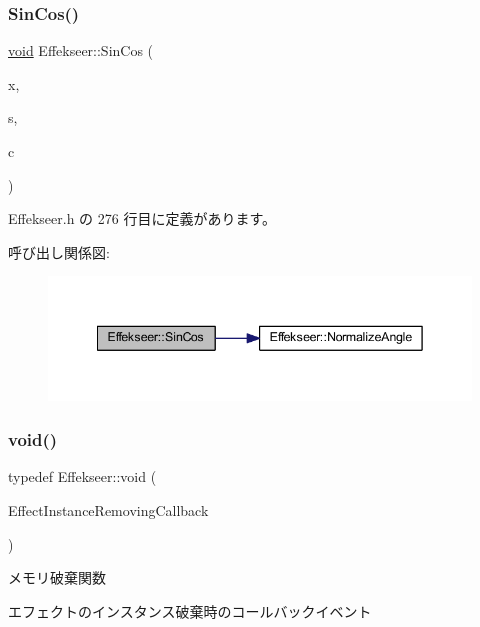 \subsubsection{\texorpdfstring{Sin\+Cos()}{SinCos()}}
{\footnotesize\ttfamily \mbox{\hyperlink{namespace_effekseer_ab34c4088e512200cf4c2716f168deb56}{void}} Effekseer\+::\+Sin\+Cos (\begin{DoxyParamCaption}\item[{float}]{x,  }\item[{float \&}]{s,  }\item[{float \&}]{c }\end{DoxyParamCaption})\hspace{0.3cm}{\ttfamily [inline]}}



 Effekseer.\+h の 276 行目に定義があります。

呼び出し関係図\+:\nopagebreak
\begin{figure}[H]
\begin{center}
\leavevmode
\includegraphics[width=342pt]{namespace_effekseer_a4eab7724e1fc9c1cb66aac61b3d568d9_cgraph}
\end{center}
\end{figure}
\mbox{\label{namespace_effekseer_ab34c4088e512200cf4c2716f168deb56}} 
\subsubsection{\texorpdfstring{void()}{void()}}
{\footnotesize\ttfamily typedef Effekseer\+::void (\begin{DoxyParamCaption}\item[{\mbox{\hyperlink{_effekseer_8h_a4b2fd0bd069299f55649055bbd485d7f}{E\+F\+K\+\_\+\+S\+T\+D\+C\+A\+LL}} $\ast$}]{Effect\+Instance\+Removing\+Callback }\end{DoxyParamCaption})}



メモリ破棄関数 

エフェクトのインスタンス破棄時のコールバックイベント


